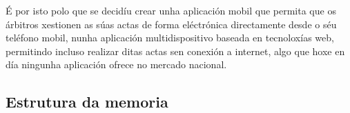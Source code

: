   É por isto polo que se decidíu crear unha aplicación mobil que permita que os árbitros 
xestionen as súas actas de forma eléctrónica directamente desde o séu teléfono mobil, 
nunha aplicación multidispositivo baseada en tecnoloxías web, permitindo incluso realizar 
ditas actas sen conexión a internet, algo que hoxe en día ningunha aplicación ofrece no 
mercado nacional.

  \subsection{Estrutura da memoria}
